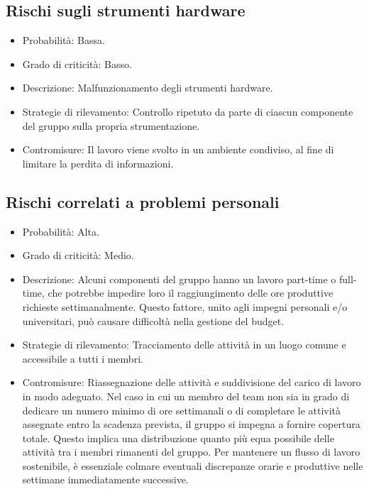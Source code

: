 \subsection{Rischi sugli strumenti hardware}
\begin{itemize}
  \item Probabilità: Bassa.
  \item Grado di criticità: Basso.
  \item Descrizione: Malfunzionamento degli strumenti hardware.
  \item Strategie di rilevamento: Controllo ripetuto da parte di ciascun componente del gruppo sulla propria strumentazione.
  \item Contromisure: Il lavoro viene svolto in un ambiente condiviso, al fine di limitare la perdita di informazioni.
\end{itemize}

\subsection{Rischi correlati a problemi personali}
\begin{itemize}
  \item Probabilità: Alta.
  \item Grado di criticità: Medio.
  \item Descrizione: Alcuni componenti del gruppo hanno un lavoro part-time o full-time, che potrebbe impedire loro il raggiungimento delle ore produttive richieste settimanalmente. Questo fattore, unito agli impegni personali e/o universitari, può causare difficoltà nella gestione del budget.
  \item Strategie di rilevamento: Tracciamento delle attività in un luogo comune e accessibile a tutti i membri.
  \item Contromisure: Riassegnazione delle attività e suddivisione del carico di lavoro in modo adeguato. Nel caso in cui un membro del team non sia in grado di dedicare un numero minimo di ore settimanali o di completare le attività assegnate entro la scadenza prevista, il gruppo si impegna a fornire copertura totale. Questo implica una distribuzione quanto più equa possibile delle attività tra i membri rimanenti del gruppo. Per mantenere un flusso di lavoro sostenibile, è essenziale colmare eventuali discrepanze orarie e produttive nelle settimane immediatamente successive.
\end{itemize}

